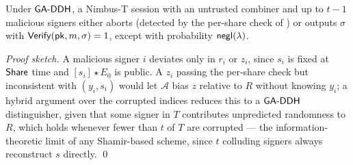 \begin{theorem}[Robustness]
\label{thm:robustness}
Under $\mathsf{GA\text{-}DDH}$, a Nimbus-T session with an untrusted combiner and up to $t-1$ malicious signers either aborts (detected by the per-share check of ) or outputs $\sigma$ with $\mathsf{Verify}(\mathsf{pk},m,\sigma)=1$, except with probability $\mathsf{negl}(\lambda)$.
\end{theorem}
\begin{proof}[Proof sketch]
A malicious signer $i$ deviates only in $r_i$ or $z_i$, since $s_i$ is fixed at $\mathsf{Share}$ time and $[s_i]\star E_0$ is public. A $z_i$ passing the per-share check but inconsistent with $(y_i,s_i)$ would let $\mathcal{A}$ bias $z$ relative to $R$ without knowing $y_i$; a hybrid argument over the corrupted indices reduces this to a $\mathsf{GA\text{-}DDH}$ distinguisher, given that some signer in $T$ contributes unpredicted randomness to $R$, which holds whenever fewer than $t$ of $T$ are corrupted --- the information-theoretic limit of any Shamir-based scheme, since $t$ colluding signers always reconstruct $s$ directly. \qed
\end{proof}

